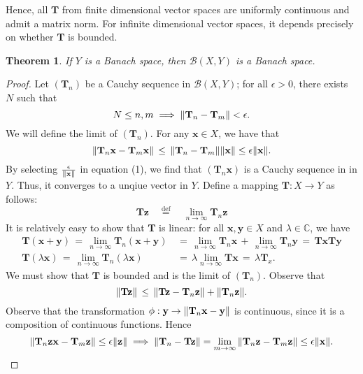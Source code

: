 \documentclass[11pt]{article}
\newtheorem{theorem}{Theorem}
\renewcommand{\vec}[1]{\mathbf{#1}}
\newcommand{\mat}[1]{\mathbf{#1}}
\begin{document}
Hence, all $\mat{T}$ from finite dimensional vector spaces are uniformly continuous and admit a matrix norm. For infinite dimensional vector spaces, it depends precisely on whether $\mat{T}$ is bounded.

\begin{theorem}
  If $Y$ is a Banach space, then $\mathcal{B}(X, Y)$ is a Banach space.
\end{theorem}
\begin{adjustwidth}{0.5cm}{}
  \begin{proof}
    Let $(\mat{T}_{n})$ be a Cauchy sequence in $\mathcal{B}(X, Y)$; for all $\epsilon > 0$, there exists $N$ such that
    \begin{equation}
      N \le n, m \implies \norm{\mat{T}_{n} - \mat{T}_{m}} < \epsilon.
    \end{equation}
    We will define the limit of $(\mat{T}_{n})$. For any $\vec{x} \in X$, we have that
    \[
      \norm{\mat{T}_{n} \vec{x} - \mat{T}_{m} \vec{x}} \, \le \, \norm{\mat{T}_{n} - \mat{T}_{m}} \norm{\vec{x}} \le \epsilon \norm{\vec{x}}.
    \]
    By selecting $\tfrac{\epsilon}{\norm{\vec{x}}}$ in equation (1), we find that $(\mat{T}_{n} \vec{x})$ is a Cauchy sequence in in $Y$. Thus, it converges to a unqiue vector in $Y$. Define a mapping $\mat{T} : X \to Y$ as follows:
    \[
      \mat{T} \vec{z} \quad \stackrel{\text{def}}{=} \quad \lim\limits_{n \to \infty} \mat{T}_{n} \vec{z}
    \]
    It is relatively easy to show that $\mat{T}$ is linear: for all $\vec{x}, \vec{y} \in X$ and $\lambda \in \mathbb{C}$, we have
    \begin{align*}
      \mat{T}(\vec{x} + \vec{y}) \, = \, \lim\limits_{n \to \infty} \mat{T}_{n}(\vec{x} + \vec{y}) \, &= \, \lim\limits_{n \to \infty} \mat{T}_{n} \vec{x} \, + \, \lim\limits_{n \to \infty} \mat{T}_{n} \vec{y} \, = \, \mat{T}\vec{x} \mat{T}\vec{y} \\
      \mat{T}(\lambda \vec{x}) \, = \, \lim\limits_{n \to \infty} \mat{T}_{n}(\lambda \vec{x}) \, &= \, \lambda \lim\limits_{n \to \infty} \mat{T} \vec{x} \, = \, \lambda \mat{T}_{x}.
    \end{align*}
    We must show that $\mat{T}$ is bounded and is the limit of $(\mat{T}_{n})$. Observe that 
    \[
      \norm{\mat{T} \vec{z}} \, \le \, \norm{\mat{T} \vec{z} - \mat{T}_{n} \vec{z}} + \norm{\mat{T}_{n} \vec{z}}.
    \]
    Observe that the transformation $\phi : \vec{y} \to \norm{\mat{T}_{n} \vec{x} - \vec{y}}$ is continuous, since it is a composition of continuous functions. Hence
    \[
      \norm{\mat{T}_{n}\vec{z} \vec{x} - \mat{T}_{m}\vec{z}} \le \epsilon \norm{\vec{z}} \implies \norm{\mat{T}_{n} - \mat{T}\vec{z}} = \lim\limits_{m \to \infty} \norm{\mat{T}_{n} \vec{z} - \mat{T}_{m} \vec{z}} \le \epsilon \norm{\vec{x}}.
\]
\end{proof}
\end{adjustwidth}
\end{document}
